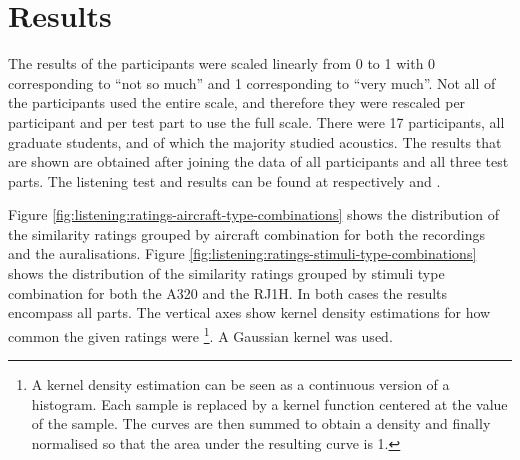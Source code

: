 
\section{Results}
The results of the participants were scaled linearly from 0 to 1 with 0
corresponding to ``not so much'' and 1 corresponding to ``very much''. Not all
of the participants used the entire scale, and therefore they were rescaled per
participant and per test part to use the full scale. There were 17 participants,
all graduate students, and of which the majority studied acoustics. The results
that are shown are obtained after joining the data of all participants and all
three test parts. The listening test and results can be found at respectively
\cite{Rietdijk2017a} and \cite{Rietdijk2017b}.

Figure \ref{fig:listening:ratings-aircraft-type-combinations} shows the distribution of the similarity ratings grouped by
aircraft combination for both the recordings and the auralisations.
Figure \ref{fig:listening:ratings-stimuli-type-combinations} shows the distribution of the similarity ratings grouped by stimuli type combination
for both the A320 and the RJ1H. In both cases the results encompass all parts.
The vertical axes show kernel density estimations for how common the given ratings were \footnote{
A kernel density estimation can be seen as a continuous version of a histogram. Each sample is replaced by a kernel function centered at the value of the sample.
The curves are then summed to obtain a density and finally normalised so that the area under the resulting curve is 1.
}. A Gaussian kernel was used.


